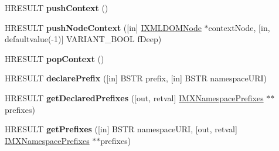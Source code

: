 \begin{DoxyCompactItemize}
\mbox{\label{interface_m_s_x_m_l2_1_1_i_v_b_m_x_namespace_manager_a4bf15211958508e9b252233668d39009}} 
H\+R\+E\+S\+U\+LT {\bfseries push\+Context} ()
\item 
\mbox{\label{interface_m_s_x_m_l2_1_1_i_v_b_m_x_namespace_manager_af3c0c8c636f2cc7122227acaa4cb1373}} 
H\+R\+E\+S\+U\+LT {\bfseries push\+Node\+Context} (\mbox{[}in\mbox{]} \hyperlink{interface_m_s_x_m_l2_1_1_i_x_m_l_d_o_m_node}{I\+X\+M\+L\+D\+O\+M\+Node} $\ast$context\+Node, \mbox{[}in, defaultvalue(-\/1)\mbox{]} V\+A\+R\+I\+A\+N\+T\+\_\+\+B\+O\+OL f\+Deep)
\item 
\mbox{\label{interface_m_s_x_m_l2_1_1_i_v_b_m_x_namespace_manager_ac7116c10d6e058ae6296215039097d51}} 
H\+R\+E\+S\+U\+LT {\bfseries pop\+Context} ()
\item 
\mbox{\label{interface_m_s_x_m_l2_1_1_i_v_b_m_x_namespace_manager_a3478b6af818b070a44a45be29116ee26}} 
H\+R\+E\+S\+U\+LT {\bfseries declare\+Prefix} (\mbox{[}in\mbox{]} B\+S\+TR prefix, \mbox{[}in\mbox{]} B\+S\+TR namespace\+U\+RI)
\item 
\mbox{\label{interface_m_s_x_m_l2_1_1_i_v_b_m_x_namespace_manager_aa0bc0b731146f37cdca55ce4a39535e5}} 
H\+R\+E\+S\+U\+LT {\bfseries get\+Declared\+Prefixes} (\mbox{[}out, retval\mbox{]} \hyperlink{interface_m_s_x_m_l2_1_1_i_m_x_namespace_prefixes}{I\+M\+X\+Namespace\+Prefixes} $\ast$$\ast$prefixes)
\item 
\mbox{\label{interface_m_s_x_m_l2_1_1_i_v_b_m_x_namespace_manager_a97a89bbf290999f5b88394a698fce4ae}} 
H\+R\+E\+S\+U\+LT {\bfseries get\+Prefixes} (\mbox{[}in\mbox{]} B\+S\+TR namespace\+U\+RI, \mbox{[}out, retval\mbox{]} \hyperlink{interface_m_s_x_m_l2_1_1_i_m_x_namespace_prefixes}{I\+M\+X\+Namespace\+Prefixes} $\ast$$\ast$prefixes)
\item 
\mbox{\label{interface_m_s_x_m_l2_1_1_i_v_b_m_x_namespace_manager_a0861f5f2b6672b502903b0d626df2d10}} 

\end{DoxyCompactItemize}
